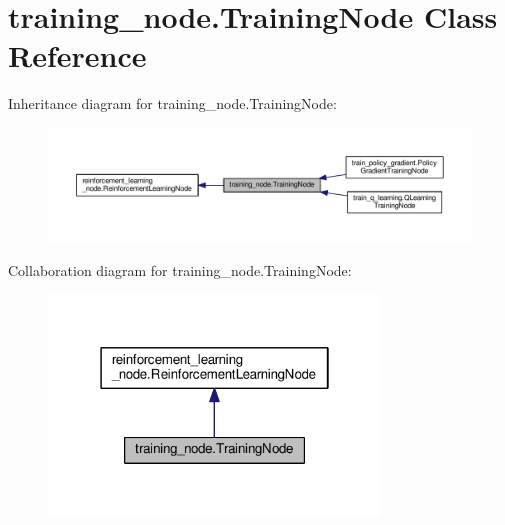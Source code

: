 \hypertarget{classtraining__node_1_1_training_node}{}\section{training\+\_\+node.\+Training\+Node Class Reference}
\label{classtraining__node_1_1_training_node}


Inheritance diagram for training\+\_\+node.\+Training\+Node\+:
\nopagebreak
\begin{figure}[H]
\begin{center}
\leavevmode
\includegraphics[width=350pt]{classtraining__node_1_1_training_node__inherit__graph}
\end{center}
\end{figure}


Collaboration diagram for training\+\_\+node.\+Training\+Node\+:
\nopagebreak
\begin{figure}[H]
\begin{center}
\leavevmode
\includegraphics[width=250pt]{classtraining__node_1_1_training_node__coll__graph}
\end{center}
\end{figure}
